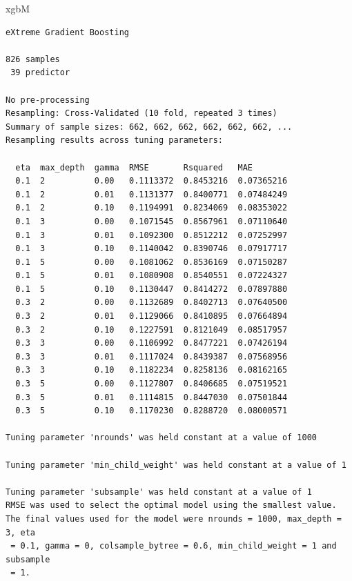 \documentclass[
  letterpaper,
  DIV=11,
  numbers=noendperiod]{scrreprt}
\newenvironment{Shaded}{\begin{snugshade}}{\end{snugshade}}
\newcommand{\NormalTok}[1]{\textcolor[rgb]{0.00,0.23,0.31}{#1}}
\newcommand{\SpecialCharTok}[1]{\textcolor[rgb]{0.37,0.37,0.37}{#1}}
\begin{document}
\begin{Shaded}
\begin{Highlighting}[]
\NormalTok{xgbM}
\end{Highlighting}
\end{Shaded}

\begin{verbatim}
eXtreme Gradient Boosting 

826 samples
 39 predictor

No pre-processing
Resampling: Cross-Validated (10 fold, repeated 3 times) 
Summary of sample sizes: 662, 662, 662, 662, 662, 662, ... 
Resampling results across tuning parameters:

  eta  max_depth  gamma  RMSE       Rsquared   MAE       
  0.1  2          0.00   0.1113372  0.8453216  0.07365216
  0.1  2          0.01   0.1131377  0.8400771  0.07484249
  0.1  2          0.10   0.1194991  0.8234069  0.08353022
  0.1  3          0.00   0.1071545  0.8567961  0.07110640
  0.1  3          0.01   0.1092300  0.8512212  0.07252997
  0.1  3          0.10   0.1140042  0.8390746  0.07917717
  0.1  5          0.00   0.1081062  0.8536169  0.07150287
  0.1  5          0.01   0.1080908  0.8540551  0.07224327
  0.1  5          0.10   0.1130447  0.8414272  0.07897880
  0.3  2          0.00   0.1132689  0.8402713  0.07640500
  0.3  2          0.01   0.1129066  0.8410895  0.07664894
  0.3  2          0.10   0.1227591  0.8121049  0.08517957
  0.3  3          0.00   0.1106992  0.8477221  0.07426194
  0.3  3          0.01   0.1117024  0.8439387  0.07568956
  0.3  3          0.10   0.1182234  0.8258136  0.08162165
  0.3  5          0.00   0.1127807  0.8406685  0.07519521
  0.3  5          0.01   0.1114815  0.8447030  0.07501844
  0.3  5          0.10   0.1170230  0.8288720  0.08000571

Tuning parameter 'nrounds' was held constant at a value of 1000

Tuning parameter 'min_child_weight' was held constant at a value of 1

Tuning parameter 'subsample' was held constant at a value of 1
RMSE was used to select the optimal model using the smallest value.
The final values used for the model were nrounds = 1000, max_depth = 3, eta
 = 0.1, gamma = 0, colsample_bytree = 0.6, min_child_weight = 1 and subsample
 = 1.
\end{verbatim}

\begin{Shaded}
\end{Shaded}
\end{document}

